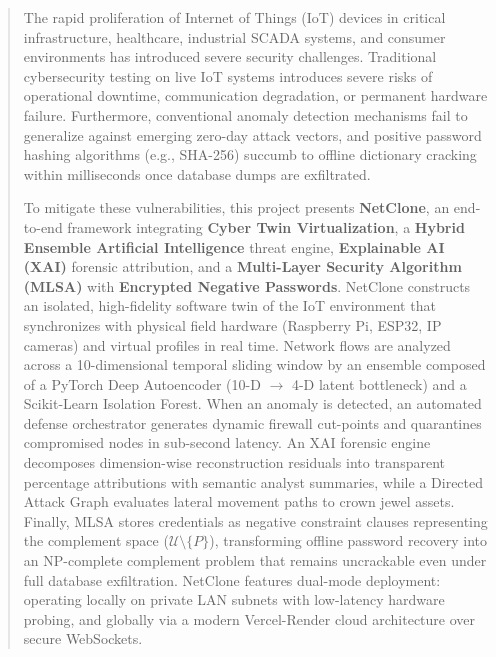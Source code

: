 \documentclass[12pt,a4paper]{report}
\begin{document}
\begin{abstract}
The rapid proliferation of Internet of Things (IoT) devices in critical infrastructure, healthcare, industrial SCADA systems, and consumer environments has introduced severe security challenges. Traditional cybersecurity testing on live IoT systems introduces severe risks of operational downtime, communication degradation, or permanent hardware failure. Furthermore, conventional anomaly detection mechanisms fail to generalize against emerging zero-day attack vectors, and positive password hashing algorithms (e.g., SHA-256) succumb to offline dictionary cracking within milliseconds once database dumps are exfiltrated.

To mitigate these vulnerabilities, this project presents \textbf{NetClone}, an end-to-end framework integrating \textbf{Cyber Twin Virtualization}, a \textbf{Hybrid Ensemble Artificial Intelligence} threat engine, \textbf{Explainable AI (XAI)} forensic attribution, and a \textbf{Multi-Layer Security Algorithm (MLSA)} with \textbf{Encrypted Negative Passwords}. NetClone constructs an isolated, high-fidelity software twin of the IoT environment that synchronizes with physical field hardware (Raspberry Pi, ESP32, IP cameras) and virtual profiles in real time. Network flows are analyzed across a 10-dimensional temporal sliding window by an ensemble composed of a PyTorch Deep Autoencoder (10-D $\to$ 4-D latent bottleneck) and a Scikit-Learn Isolation Forest. When an anomaly is detected, an automated defense orchestrator generates dynamic firewall cut-points and quarantines compromised nodes in sub-second latency. An XAI forensic engine decomposes dimension-wise reconstruction residuals into transparent percentage attributions with semantic analyst summaries, while a Directed Attack Graph evaluates lateral movement paths to crown jewel assets. Finally, MLSA stores credentials as negative constraint clauses representing the complement space ($\mathcal{U} \setminus \{P\}$), transforming offline password recovery into an NP-complete complement problem that remains uncrackable even under full database exfiltration. NetClone features dual-mode deployment: operating locally on private LAN subnets with low-latency hardware probing, and globally via a modern Vercel-Render cloud architecture over secure WebSockets.
\end{abstract}
\end{document}
